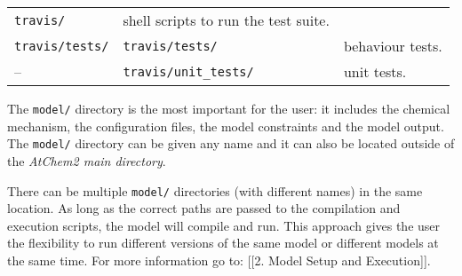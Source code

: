 \begin{longtable}[]{@{}lll@{}}
\begin{minipage}[t]{0.24\columnwidth}
\texttt{travis/}\strut
\end{minipage} & \begin{minipage}[t]{0.48\columnwidth}\raggedright
shell scripts to run the test suite.\strut
\end{minipage}\tabularnewline
\begin{minipage}[t]{0.20\columnwidth}\raggedright
\texttt{travis/tests/}\strut
\end{minipage} & \begin{minipage}[t]{0.24\columnwidth}\raggedright
\texttt{travis/tests/}\strut
\end{minipage} & \begin{minipage}[t]{0.48\columnwidth}\raggedright
behaviour tests.\strut
\end{minipage}\tabularnewline
\begin{minipage}[t]{0.20\columnwidth}\raggedright
--\strut
\end{minipage} & \begin{minipage}[t]{0.24\columnwidth}\raggedright
\texttt{travis/unit\_tests/}\strut
\end{minipage} & \begin{minipage}[t]{0.48\columnwidth}\raggedright
unit tests.\strut
\end{minipage}\tabularnewline
\end{longtable}

The \texttt{model/} directory is the most important for the user: it
includes the chemical mechanism, the configuration files, the model
constraints and the model output. The \texttt{model/} directory can be
given any name and it can also be located outside of the \emph{AtChem2
main directory}.

There can be multiple \texttt{model/} directories (with different names)
in the same location. As long as the correct paths are passed to the
compilation and execution scripts, the model will compile and run. This
approach gives the user the flexibility to run different versions of the
same model or different models at the same time. For more information go
to: {[}{[}2. Model Setup and Execution{]}{]}.
